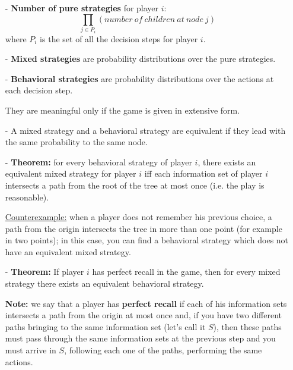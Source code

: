 
%



\begin{itemize}
	\item[-] \textbf{Number of pure strategies} for player $i$:
		\[
			\prod_{j \in P_i}{\left(number~of~children 
			~at~node~j\right)}
		\]
		where $P_i$ is the set of all the decision steps for 
		player $i$.
	\item[-] \textbf{Mixed strategies} are probability distributions 
		over the pure strategies.
	\item[-] \textbf{Behavioral strategies} are probability 
		distributions over the actions at each decision step.

		\noindent They are meaningful only if the game is given in 
		extensive form.
	\item[-] A mixed strategy and a behavioral strategy are equivalent 
		if they lead with the same probability to the same node.
	\item[-] \textbf{Theorem:} for every behavioral strategy of player 
		$i$, there exists an equivalent mixed strategy for player 
		$i$ iff each information 
		set of player $i$ intersects a path from the root of the 
		tree at most once (i.e. the play is reasonable).

		\noindent \underline{Counterexample:} when a player does 
		not remember his previous choice, a path from the origin 
		intersects the tree in more than one point (for example 
		in two points); in this case, you can find a behavioral 
		strategy which does not have an equivalent mixed strategy.
	\item[-] \textbf{Theorem:} If player $i$ has perfect recall in the 
		game, then for every mixed strategy there exists an 
		equivalent behavioral strategy.

		\noindent \textbf{Note:} we say that a player has 
		\textbf{perfect recall} if each of his information sets 
		intersects a path from the origin at most once and, if 
		you have two different paths bringing to the same 
		information set (let's call it $S$), then these paths must 
		pass through the same information sets at the previous step 
		and you must arrive in $S$, following each one of the paths, 
		performing the same actions.


\end{itemize}
